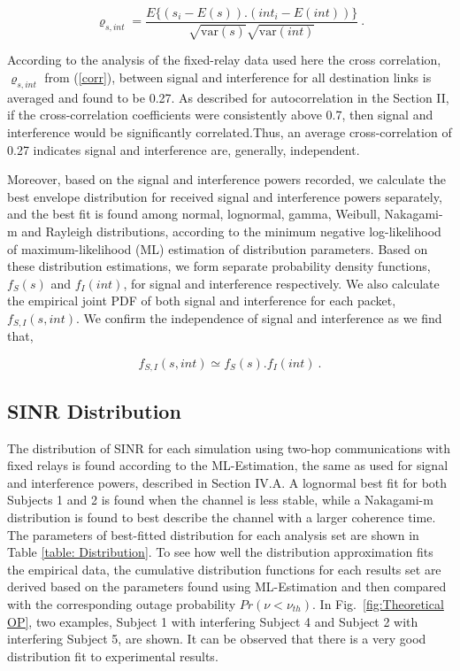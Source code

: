 \documentclass[12pt,draftcls,a4paper,onecolumn,journal]{IEEEtran}
\begin{document}
 \begin{equation}
\varrho_{s,int}=\frac{E\{\left(s_{i}-E(s)\right).\left(int_i-E(int)\right)\}}{\sqrt{\mathrm{var}(s)}\sqrt{\mathrm{var}(int)}}~.
\label{corr}
\end{equation}

According to the analysis of the fixed-relay data used here the cross correlation, $\varrho_{s,int}$ from (\ref{corr}), between signal and interference for all destination links is averaged and found to be 0.27. As described for autocorrelation in the Section II, if the cross-correlation coefficients were consistently above 0.7, then signal and interference would be significantly correlated.Thus, an average cross-correlation of 0.27 indicates signal and interference are, generally, independent.


Moreover, based on the signal and interference powers recorded, we calculate the best envelope distribution for received signal and interference powers separately, and the best fit is found among normal, lognormal, gamma, Weibull, Nakagami-m and Rayleigh distributions, according to the minimum negative log-likelihood of maximum-likelihood (ML) estimation of distribution parameters. Based on these distribution estimations, we form separate probability density functions, $f_S(s)$ and $f_I(int)$, for signal and interference respectively. We also calculate the empirical joint PDF of both signal and interference for each packet, $f_{S,I}(s,int)$. We confirm the independence of signal and interference as we find that,

\begin{equation}
f_{S,I}(s,int)\simeq f_S(s).f_I(int)~.
\label{SIR distribution}
\end{equation}

\subsection{SINR Distribution}
The distribution of SINR for each simulation using two-hop communications with fixed relays is found according to the ML-Estimation, the same as used for signal and interference powers, described in Section IV.A.  A lognormal best fit for both Subjects 1 and 2 is found when the channel is less stable, while a Nakagami-m distribution is found to best describe the channel with a larger coherence time.  The parameters of best-fitted distribution for each analysis set are shown in Table \ref{table: Distribution}. To see how well the distribution approximation fits the empirical data, the cumulative distribution functions for each results set are derived based on the parameters found using ML-Estimation and then compared with the corresponding outage probability $Pr(\nu < \nu_{th})$. In Fig.~\ref{fig:Theoretical OP}, two examples, Subject 1 with  interfering Subject 4 and Subject 2 with interfering Subject 5, are shown. It can be observed that  there is a very good distribution fit to experimental results.
\end{document}
